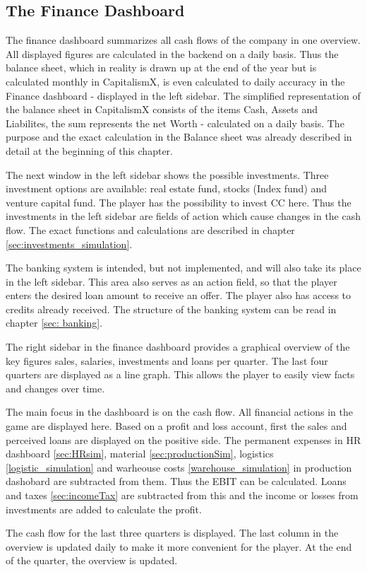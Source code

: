 \subsection{The Finance Dashboard}

The finance dashboard summarizes all cash flows of the company in one overview. All displayed figures are calculated in the backend on a daily basis. Thus the balance sheet, which in reality is drawn up at the end of the year but is calculated monthly in CapitalismX, is even calculated to daily accuracy in the Finance dashboard - displayed in the left sidebar. The simplified representation of the balance sheet in CapitalismX consists of the items Cash, Assets and Liabilites, the sum represents the net Worth - calculated on a daily basis. The purpose and the exact calculation in the Balance sheet was already described in detail at the beginning of this chapter. 

The next window in the left sidebar shows the possible investments. Three investment options are available: real estate fund, stocks (Index fund) and venture capital fund. The player has the possibility to invest CC here. Thus the investments in the left sidebar are fields of action which cause changes in the cash flow. The exact functions and calculations are described in chapter \ref{sec:investments_simulation}. 

The banking system is intended, but not implemented, and will also take its place in the left sidebar. This area also serves as an action field, so that the player enters the desired loan amount to receive an offer. The player also has access to credits already received. The structure of the banking system can be read in chapter \ref{sec: banking}. 

The right sidebar in the finance dashboard provides a graphical overview of the key figures sales, salaries, investments and loans per quarter. The last four quarters are displayed as a line graph. This allows the player to easily view facts and changes over time. 

The main focus in the dashboard is on the cash flow. All financial actions in the game are displayed here. Based on a profit and loss account, first the sales and perceived loans are displayed on the positive side. The permanent expenses in HR dashboard \ref{sec:HRsim}, material \ref{sec:productionSim}, logistics \ref{logistic_simulation} and warheouse costs \ref{warehouse_simulation} in production dashobard are subtracted from them. Thus the EBIT can be calculated. Loans and taxes \ref{sec:incomeTax} are subtracted from this and the income or losses from investments are added to calculate the profit.

The cash flow for the last three quarters is displayed. The last column in the overview is updated daily to make it more convenient for the player. At the end of the quarter, the overview is updated. 
